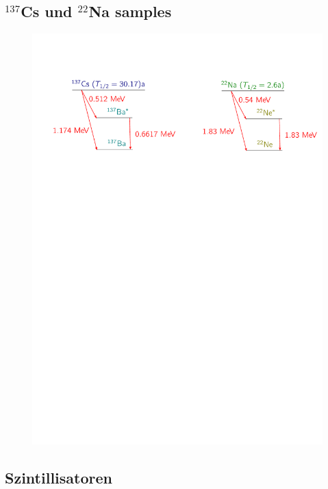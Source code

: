 \documentclass[xcolor=x11names,compress]{beamer}
\renewcommand{\(}{\begin{columns}}
\renewcommand{\)}{\end{columns}}
\newcommand{\<}[1]{\begin{column}{#1}}
\renewcommand{\>}{\end{column}}
\begin{document}
\subsection{$^{137}$Cs und  $^{22}$Na samples}
\begin{frame}
 \begin{figure}[htpb]
    \centering
    \includegraphics[width=1.0\linewidth]{../figures/terms}
\label{fig:term_schemata}
\end{figure}
\end{frame}

\subsection{Szintillisatoren}
\end{document}
